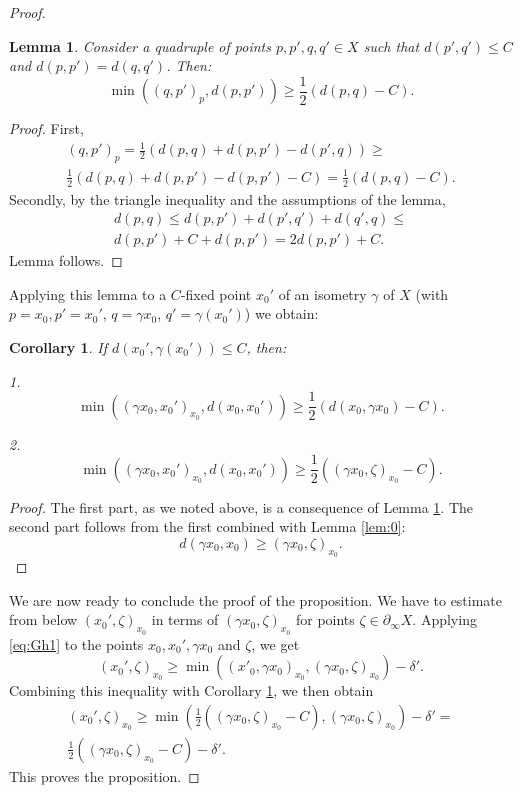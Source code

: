 \documentclass[12pt]{amsbook}%
\newtheorem{lem}[thm]{Lemma}
\newtheorem{cor}[thm]{Corollary}
\theoremstyle{definition}
\theoremstyle{remark}
\numberwithin{section}{chapter}
\numberwithin{subsection}{section}
\numberwithin{figure}{chapter}
\def\half{\frac{1}{2}}
\def\ga{\gamma}
\def\geo{\partial_\infty}
\begin{document}
{{\begin{proof}
\begin{lem}\label{lem:prod-dist} 
Consider a quadruple of points $p, p', q, q'\in X$ such that $d(p', q')\leqslant C$ and 
$d(p, p')= d(q, q')$. Then: 
$$
\min( (q, p')_p, d(p, p'))  \geqslant \half (d(p, q) - C). 
$$
\end{lem}
\begin{proof} First, 
\begin{align*}
(q, p')_p = \half( d(p, q) + d(p, p')  - d(p', q))\geqslant \\
 \half(d(p, q) + d(p, p')  - d(p, p')- C)= \half ( d(p, q) - C). 
\end{align*}
Secondly, by the triangle inequality and the assumptions of the lemma,
\begin{align*}
d(p,q)\leqslant d(p, p') + d(p', q') + d(q', q)\leqslant \\
d(p, p') + C + d(p, p')= 2 d(p, p') +C. 
\end{align*}
Lemma follows. \end{proof}

\medskip
Applying this lemma to a $C$-fixed point $x_0'$ of an isometry $\ga$ of $X$ (with $p=x_0, p'=x_0'$, $q=\ga x_0$, $q'=\ga(x_0')$) we obtain:

\begin{cor}\label{cor:prod-dist}
If $d(x_0', \ga(x_0'))\leqslant C$, then:  

1. $$
\min( (\ga x_0, x_0')_{x_0}, d(x_0, x_0'))  \geqslant \half (d(x_0, \ga x_0) - C). 
$$ 

2. $$
\min( (\ga x_0, x_0')_{x_0}, d(x_0, x_0'))  \geqslant \half ((\ga x_0, \zeta)_{x_0} - C). 
$$ 
\end{cor}
\begin{proof} The first part, as we noted above, is a consequence of  Lemma \ref{lem:prod-dist}. The second part follows from the first 
combined with Lemma  \ref{lem:0}:
$$
 d(\ga x_0,x_0)\geqslant (\ga x_0, \zeta)_{x_0}.  
$$
\end{proof}

We are now ready to conclude the proof of the proposition. 
We have to estimate from below $(x_0', \zeta)_{x_0}$ in terms of $(\ga x_0, \zeta)_{x_0}$ for points $\zeta\in \geo X$. 
Applying \eqref{eq:Gh1} to the points $x_0, x_0', \ga x_0$ and $\zeta$, we get 
$$
(x_0',\zeta)_{x_0} \geqslant \min( (x'_0, \ga x_0)_{x_0}, (\ga x_0, \zeta)_{x_0}) -\delta'.$$
Combining this inequality with Corollary \ref{cor:prod-dist}, we then obtain
\begin{align*}
(x_0',\zeta)_{x_0} \geqslant   \min \left( \half ((\ga x_0, \zeta)_{x_0} - C), (\ga x_0, \zeta)_{x_0}\right) -\delta' =\\ 
\half \left((\ga x_0, \zeta)_{x_0} - C\right) - \delta'. 
\end{align*}
This proves the proposition. \end{proof}


}}
\end{document}
